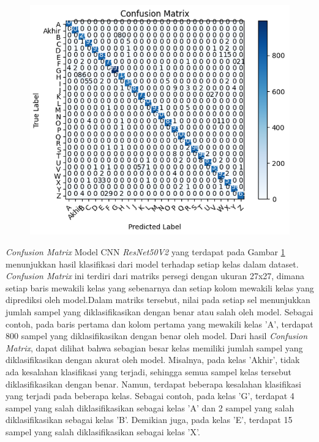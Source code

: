 \begin{figure}[!hbt]
	\centering
	\includegraphics[width=0.7\linewidth]{gambar/bener/ConfusionMatrix_ModelCNNResNet50V2.png}
	\label{fig:TabelModelCNNResNet50v2}
\end{figure}
\textit{Confusion Matrix} Model CNN \textit{ResNet50V2} yang terdapat pada Gambar \ref{fig:TabelModelCNNResNet50v2} menunjukkan hasil klasifikasi dari model terhadap setiap kelas dalam dataset. \textit{Confusion Matrix} ini terdiri dari matriks persegi dengan ukuran 27x27, dimana setiap baris mewakili kelas yang sebenarnya dan setiap kolom mewakili kelas yang diprediksi oleh model.Dalam matriks tersebut, nilai pada setiap sel menunjukkan jumlah sampel yang diklasifikasikan dengan benar atau salah oleh model. Sebagai contoh, pada baris pertama dan kolom pertama yang mewakili kelas 'A', terdapat 800 sampel yang diklasifikasikan dengan benar oleh model. Dari hasil \textit{Confusion Matrix}, dapat dilihat bahwa sebagian besar kelas memiliki jumlah sampel yang diklasifikasikan dengan akurat oleh model. Misalnya, pada kelas 'Akhir', tidak ada kesalahan klasifikasi yang terjadi, sehingga semua sampel kelas tersebut diklasifikasikan dengan benar. Namun, terdapat beberapa kesalahan klasifikasi yang terjadi pada beberapa kelas. Sebagai contoh, pada kelas 'G', terdapat 4 sampel yang salah diklasifikasikan sebagai kelas 'A' dan 2 sampel yang salah diklasifikasikan sebagai kelas 'B'. Demikian juga, pada kelas 'E', terdapat 15 sampel yang salah diklasifikasikan sebagai kelas 'X'.

